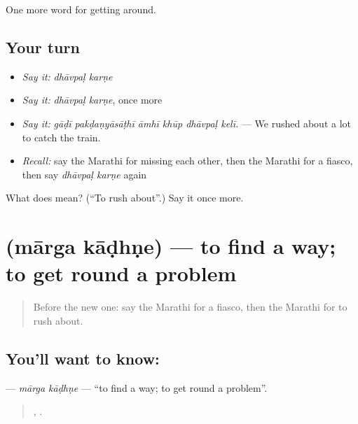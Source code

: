 \begin{grammarlens}[title={What you've built}]
One more word for getting around.
\end{grammarlens}

\subsection*{Your turn}
\begin{itemize}
\raggedright
  \item \emph{Say it:} \emph{dhāvpaḷ karṇe}
  \item \emph{Say it:} \emph{dhāvpaḷ karṇe}, once more
  \item \emph{Say it:} \emph{gāḍī pakḍaṇyāsāṭhī āmhī khūp dhāvpaḷ kelī.} — We rushed about a lot to catch the train.
  \item \emph{Recall:} say the Marathi for missing each other, then the Marathi for a fiasco, then say \emph{dhāvpaḷ karṇe} again
\end{itemize}

\begin{tcolorbox}[breakable,colback=teal!4,colframe=teal!35!black,title={Before you move on}]
What does   mean? (\textquotedblleft{}To rush about\textquotedblright{}.) Say it once more.
\end{tcolorbox}
\section[\texorpdfstring{\mr{मार्ग} \mr{काढणे} (mārga kāḍhṇe)}{मार्ग काढणे (mārga kāḍhṇe)}]{  (mārga kāḍhṇe) — to find a way; to get round a problem}

\label{lesson:MR-C434-marga-kadhne}



\begin{quote}
Before the new one: say the Marathi for a fiasco, then the Marathi for to rush about.
\end{quote}

\subsection*{You'll want to know:  }
\textbf{ } — \emph{mārga kāḍhṇe} — \textquotedblleft{}to find a way; to get round a problem\textquotedblright{}.

\begin{quote}
  ,    .
\end{quote}

